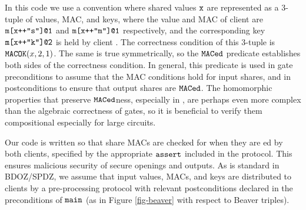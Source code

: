 In this code we use a convention where shared values $\texttt{x}$ are
represented as a 3-tuple of values, MAC, and keys, where the value and
MAC of client  are $\texttt{m[x++"s"]@1}$ and $\texttt{m[x++"m"]@1}$
respectively, and the corresponding key $\texttt{m[x++"k"]@2}$ is held by
client . The correctness condition of this 3-tuple is
$\texttt{MACOK}(x,2,1)$. The same is true symmetrically, so the
$\texttt{MACed}$ predicate establishes both sides of the correctness
condition.  In general, this predicate is used in gate preconditions
to assume that the MAC conditions hold for input shares, and in
postconditions to ensure that output shares are $\texttt{MACed}$. The
homomorphic properties that preserve $\texttt{MACed}$ness, especially in
, are perhaps even more complex than the algebraic
correctness of gates, so it is beneficial to verify them compositional
especially for large circuits.

Our code is written so that share MACs are checked for when they are
ed by both clients, specified by the appropriate
$\texttt{assert}$ included in the protocol. This ensures malicious
security of secure openings and outputs. As is standard in BDOZ/SPDZ,
we assume that input values, MACs, and keys are distributed to clients
by a pre-processing protocol with relevant postconditions
declared in the preconditions of $\texttt{main}$ (as in Figure
\ref{fig-beaver} with respect to Beaver triples).

